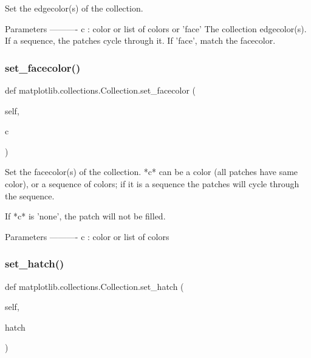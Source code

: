 \begin{DoxyVerb}Set the edgecolor(s) of the collection.

Parameters
----------
c : color or list of colors or 'face'
    The collection edgecolor(s).  If a sequence, the patches cycle
    through it.  If 'face', match the facecolor.
\end{DoxyVerb}
 \mbox{\label{classmatplotlib_1_1collections_1_1Collection_aed353579b36577d0483167f64fb4f9ef}} 
\subsubsection{\texorpdfstring{set\+\_\+facecolor()}{set\_facecolor()}}
{\footnotesize\ttfamily def matplotlib.\+collections.\+Collection.\+set\+\_\+facecolor (\begin{DoxyParamCaption}\item[{}]{self,  }\item[{}]{c }\end{DoxyParamCaption})}

\begin{DoxyVerb}Set the facecolor(s) of the collection. *c* can be a color (all patches
have same color), or a sequence of colors; if it is a sequence the
patches will cycle through the sequence.

If *c* is 'none', the patch will not be filled.

Parameters
----------
c : color or list of colors
\end{DoxyVerb}
 \mbox{\label{classmatplotlib_1_1collections_1_1Collection_aace5f58c977e2ece4efb233693e12614}} 
\subsubsection{\texorpdfstring{set\+\_\+hatch()}{set\_hatch()}}
{\footnotesize\ttfamily def matplotlib.\+collections.\+Collection.\+set\+\_\+hatch (\begin{DoxyParamCaption}\item[{}]{self,  }\item[{}]{hatch }\end{DoxyParamCaption})}


